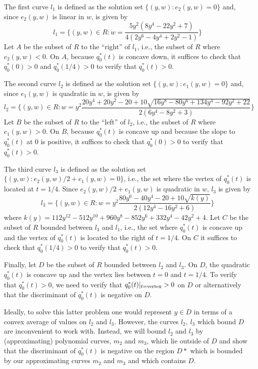 \documentclass[12pt]{icgft}
\theoremstyle{definition}
\numberwithin{equation}{section}
\begin{document}
The first curve $l_1$ is defined as the solution set $\{(y,w) : e_2(y,w) = 0 \}$ and, since $e_2(y,w)$ is linear in $w$, is given by
$$ l_1 = \{(y,w) \in R : w = \frac{5y^2(8y^4-22y^2+7)}{4(2y^6 -4y^4+2y^2-1)} \}$$
\noindent Let $A$ be the subset of $R$ to the ``right'' of $l_1$, i.e., the subset of $R$ where $e_2(y,w) < 0$.  On $A$, because $q_0^*(t)$ is concave down, it suffices to check that $q_0^*(0) > 0$ and $q_0^*(1/4) > 0$ to verify that $q_0^*(t) > 0$.

The second curve $l_2$ is defined as the solution set $\{(y,w) : e_1(y,w) = 0 \}$ and, since $e_1(y,w)$ is quadratic in $w$, is given by
$$l_2 = \{ (y,w) \in R : w = y^2\frac{20y^4 +20y^2 -20 + 10\sqrt{16y^8-80y^6+134y^4-92y^2+22}}
{2(6y^4 -8y^2 + 3)} \}$$
\noindent Let $B$ be the subset of $R$ to the ``left'' of $l_2$, i.e., the subset of $R$ where $e_1(y,w) > 0$.  On $B$, because $q_0^*(t)$ is concave up and because the slope to $q_0^*(t)$ at 0 is positive, it suffices to check that $q_0^*(0) > 0$ to verify that $q_0^*(t) > 0$.

The third curve $l_3$ is defined as the solution set $\{(y,w) : e_2(y,w)/2 + e_1(y,w) = 0 \}$, i.e., the set where the vertex of $q_0^*(t)$ is located at $t=1/4$.  Since $e_2(y,w)/2 + e_1(y,w)$ is quadratic in $w$, $l_3$ is given by
$$l_3 = \{ (y,w) \in R : w = y^2\frac{80y^6 - 40y^4-20 + 10\sqrt{k(y)}}
{2(12y^4 -16y^2 + 6)} \}$$
\noindent where $k(y) = 112y^{12} - 512y^{10}+ 960y^8-852y^6 +332y^4 - 42y^2 + 4$.
\noindent Let $C$ be the subset of $R$ bounded between $l_3$ and $l_1$, i.e., the set where $q_0^*(t)$ is concave up and the vertex of $q_0^*(t)$ is located to the right of $t=1/4$.  On $C$ it suffices to check that $q_0^*(1/4) > 0$ to verify that $q_0^*(t) > 0$.

Finally, let $D$ be the subset of $R$ bounded between $l_2$ and $l_3$.  On $D$, the quadratic $q_0^*(t)$ is concave up and the vertex lies between $t=0$ and $t=1/4$.  To verify that $q_0^*(t) > 0$, we need to verify that $q_0^*(t)|_{t={\rm vertex}} > 0$ on $D$ or alternatively that the discriminant of $q_0^*(t)$ is negative on $D$.

Ideally, to solve this latter problem one would represent $y \in D$ in terms of a convex average of values on $l_2$ and $l_3$. However, the curves $l_2,\ l_3$ which bound $D$ are inconvenient to work with.  Instead, we will bound $l_2$ and $l_3$ by (approximating) polynomial curves, $m_2$ and $m_3$, which lie outside of $D$ and show that the  discriminant of $q_0^*(t)$ is negative on the region $D*$ which is bounded by our approximating curves $m_2$ and $m_3$ and which contains $D$.
\end{document}

